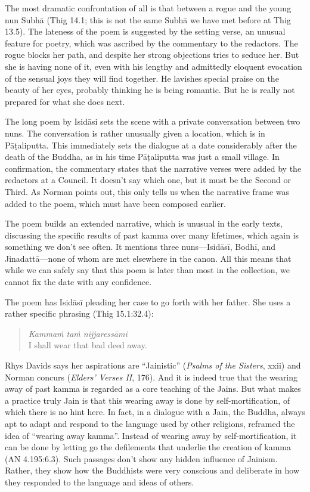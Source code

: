 \documentclass[12pt,openany]{book}%
\begin{document}
The most dramatic confrontation of all is that between a rogue and the young nun \textsanskrit{Subhā} (Thig 14.1; this is not the same \textsanskrit{Subhā} we have met before at Thig 13.5). The lateness of the poem is suggested by the setting verse, an unusual feature for poetry, which was ascribed by the commentary to the redactors. The rogue blocks her path, and despite her strong objections tries to seduce her. But she is having none of it, even with his lengthy and admittedly eloquent evocation of the sensual joys they will find together. He lavishes special praise on the beauty of her eyes, probably thinking he is being romantic. But he is really not prepared for what she does next.

The long poem by \textsanskrit{Isidāsi} sets the scene with a private conversation between two nuns. The conversation is rather unusually given a location, which is in \textsanskrit{Pāṭaliputta}. This immediately sets the dialogue at a date considerably after the death of the Buddha, as in his time \textsanskrit{Pāṭaliputta} was just a small village. In confirmation, the commentary states that the narrative verses were added by the redactors at a Council. It doesn’t say which one, but it must be the Second or Third. As Norman points out, this only tells us when the narrative frame was added to the poem, which must have been composed earlier.

The poem builds an extended narrative, which is unusual in the early texts, discussing the specific results of past kamma over many lifetimes, which again is something we don’t see often. It mentions three nuns—\textsanskrit{Isidāsī}, \textsanskrit{Bodhī}, and \textsanskrit{Jinadattā}—none of whom are met elsewhere in the canon. All this means that while we can safely say that this poem is later than most in the collection, we cannot fix the date with any confidence.

The poem has \textsanskrit{Isidāsī} pleading her case to go forth with her father. She uses a rather specific phrasing (Thig 15.1:32.4):

\begin{quotation}%
\textit{\textsanskrit{Kammaṁ} \textsanskrit{taṁ} \textsanskrit{nijjaressāmi}} \\
I shall wear that bad deed away.

%
\end{quotation}

Rhys Davids says her aspirations are “Jainistic” (\textit{Psalms of the Sisters}, xxii) and Norman concurs (\textit{Elders’ Verses II}, 176). And it is indeed true that the wearing away of past kamma is regarded as a core teaching of the Jains. But what makes a practice truly Jain is that this wearing away is done by self-mortification, of which there is no hint here. In fact, in a dialogue with a Jain, the Buddha, always apt to adapt and respond to the language used by other religions, reframed the idea of “wearing away kamma”. Instead of wearing away by self-mortification, it can be done by letting go the defilements that underlie the creation of kamma (AN 4.195:6.3). Such passages don’t show any hidden influence of Jainism. Rather, they show how the Buddhists were very conscious and deliberate in how they responded to the language and ideas of others.
\end{document}
